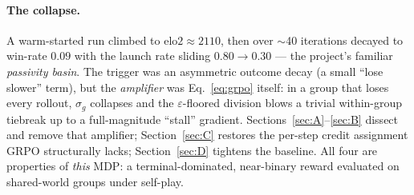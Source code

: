 \documentclass[11pt]{article}
\begin{document}
\paragraph{The collapse.} A warm-started run climbed to $\mathrm{elo2}\approx2110$, then over $\sim$40
iterations decayed to win-rate $0.09$ with the launch rate sliding $0.80\to0.30$ --- the project's
familiar \emph{passivity basin}. The trigger was an asymmetric outcome decay (a small ``lose slower''
term), but the \emph{amplifier} was Eq.~\eqref{eq:grpo} itself: in a group that loses every rollout,
$\sigma_g$ collapses and the $\varepsilon$-floored division blows a trivial within-group tiebreak up to
a full-magnitude ``stall'' gradient. Sections~\ref{sec:A}--\ref{sec:B} dissect and remove that
amplifier; Section~\ref{sec:C} restores the per-step credit assignment GRPO structurally lacks;
Section~\ref{sec:D} tightens the baseline. All four are properties of \emph{this} MDP: a
terminal-dominated, near-binary reward evaluated on shared-world groups under self-play.

\end{document}

